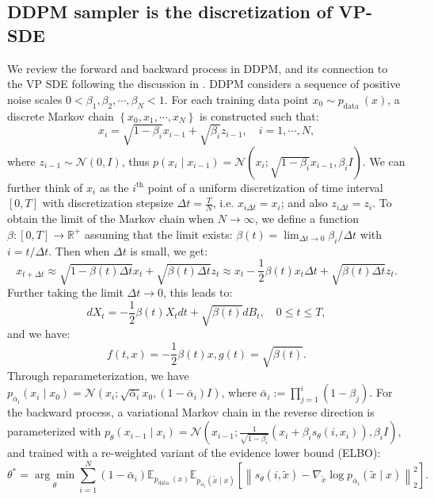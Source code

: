 \documentclass{article}
\theoremstyle{plain}
\theoremstyle{definition}
\theoremstyle{remark}
\begin{document}
\subsection{DDPM sampler is the discretization of VP-SDE}
\label{app:ddpm}
We review the forward and backward process in DDPM, and its connection to the VP SDE following the discussion in \cite{Song20SGMbySDE,SBDM_tutorial}. DDPM considers a sequence of positive noise scales $0<\beta_1, \beta_2, \cdots, \beta_N<1$. For each training data point $x_0 \sim p_{\text {data }}(x)$, a discrete Markov chain $\left\{x_0, x_1, \cdots, x_N\right\}$ is constructed such that:
\begin{equation}
\label{DDPM forward}
x_i=\sqrt{1-\beta_i} x_{i-1}+\sqrt{\beta_i} z_{i-1}, \quad i=1, \cdots, N,
\end{equation}
where $z_{i-1} \sim \mathcal{N}(0, I)$, thus $p\left(x_i \mid x_{i-1}\right)=\mathcal{N}\left(x_i ; \sqrt{1-\beta_i} x_{i-1}, \beta_i I\right)$. We can further think of $x_i$ as the $i^{\text{th}}$ point of a uniform discretization of time interval $[0,T]$ with discretization stepsize $\Delta t=\frac{T}{N}$, i.e. $x_{i \Delta t}=x_i$; and also $z_{i \Delta t}=z_i$. To obtain the limit of the Markov chain when $N \rightarrow \infty$, we define a function $\beta:[0,T]\rightarrow \mathbb{R}^+$ assuming that the limit exists: $\beta(t)= \lim_{\Delta t\rightarrow 0}\beta_i /\Delta t$ with $i=t/\Delta t$. Then when $\Delta t$ is small, we get:
$$x_{t+\Delta t}\approx\sqrt{1-\beta(t) \Delta t} x_t+\sqrt{\beta(t) \Delta t} z_t \approx x_t-\frac{1}{2} \beta(t) x_t \Delta t+\sqrt{\beta(t) \Delta t} z_t.$$
Further taking the limit $\Delta t \rightarrow 0$, this leads to:
$$
d X_t=-\frac{1}{2} \beta(t) X_t d t+\sqrt{\beta(t)} d B_t, \quad 0 \leq t \leq T,
$$
and we have:
$$
f(t, x)=-\frac{1}{2} \beta(t) x, g(t)=\sqrt{\beta(t)}.
$$
Through reparameterization, we have $p_{\bar{\alpha}_i}\left(x_i \mid x_0\right)=\mathcal{N}\left(x_i ; \sqrt{\bar{\alpha}_i} x_0,\left(1-\bar{\alpha}_i\right) I\right)$, where $\bar{\alpha}_i:=\prod_{j=1}^i\left(1-\beta_j\right)$. For the backward process, a variational Markov chain in the reverse direction is parameterized with $p_{\theta}\left(x_{i-1} \mid x_i\right)=\mathcal{N}\left(x_{i-1} ; \frac{1}{\sqrt{1-\beta_i}}\left(x_i+\beta_i s_{\theta}\left(i,x_i\right)\right), \beta_i I\right)$, and trained with a re-weighted variant of the evidence lower bound (ELBO):
$$
\theta^*=\underset{\theta}{\arg \min } \sum_{i=1}^N\left(1-\bar{\alpha}_i\right) \mathbb{E}_{p_{\text {data }}(x)} \mathbb{E}_{p_{\bar{\alpha}_i}(\tilde{x} \mid x)}\left[\left\|s_{\theta}(i,\tilde{x})-\nabla_{\tilde{x}} \log p_{\bar{\alpha}_i}(\tilde{x} \mid x)\right\|_2^2\right] .
$$
\end{document}
